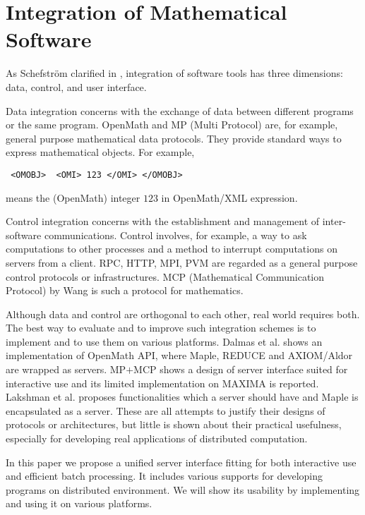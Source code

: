 
\section{Integration of Mathematical Software} 

As Schefstr\"om clarified in \cite{schefstrom},
integration of software tools has three dimensions:
data, control, and user interface.

Data integration concerns with the exchange of data between different
programs or the same program.
OpenMath \cite{OpenMath} and MP (Multi Protocol) \cite{GKW} are,
for example, general purpose mathematical data protocols.
They provide standard ways to express mathematical objects.
For example,
\begin{verbatim}
 <OMOBJ>  <OMI> 123 </OMI> </OMOBJ>
\end{verbatim}
means the (OpenMath) integer $123$ in OpenMath/XML expression.

Control integration concerns with the establishment and management of
inter-software communications.
Control involves, for example, a way to ask computations to other processes
and a method to interrupt computations on servers from a client.
RPC, HTTP, MPI, PVM are regarded as a general purpose control protocols or
infrastructures.
MCP (Mathematical Communication Protocol)
by Wang \cite{iamc} is such a protocol for mathematics.

Although data and control are orthogonal to each other, real world
requires both. The best way to evaluate and to improve such
integration schemes is to implement and to use them on various
platforms.  Dalmas et al. \cite{omimp} shows an implementation of
OpenMath API, where Maple, REDUCE and
AXIOM/Aldor are wrapped as servers.  MP$+$MCP \cite{iamc} shows a design
of server interface suited for interactive use and its limited
implementation on MAXIMA is reported.  Lakshman et al. \cite{pseware}
proposes functionalities which a server should have and Maple is
encapsulated as a server. These are all attempts to justify their
designs of protocols or architectures, but little is shown about their
practical usefulness, especially for developing real applications of
distributed computation.

In this paper we propose a unified server interface fitting for both
interactive use and efficient batch processing. 
It includes various supports for developing programs on distributed 
environment. We will show its
usability by implementing and using it on various platforms.

